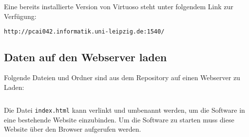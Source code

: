 \documentclass[11pt,a4paper]{article}
\begin{document}
Eine bereits installierte Version von Virtuoso steht unter folgendem Link zur Verfügung:
\begin{lstlisting}
http://pcai042.informatik.uni-leipzig.de:1540/
\end{lstlisting}
\subsection{Daten auf den Webserver laden}
Folgende Dateien und Ordner sind aus dem Repository auf einen Webserver zu Laden:
\begin{lstlisting}

\end{lstlisting}
Die Datei \lstinline$index.html$ kann verlinkt und umbenannt werden, um die Software in eine bestehende Website einzubinden.
Um die Software zu starten muss diese Website über den Browser aufgerufen werden.
\end{document}
